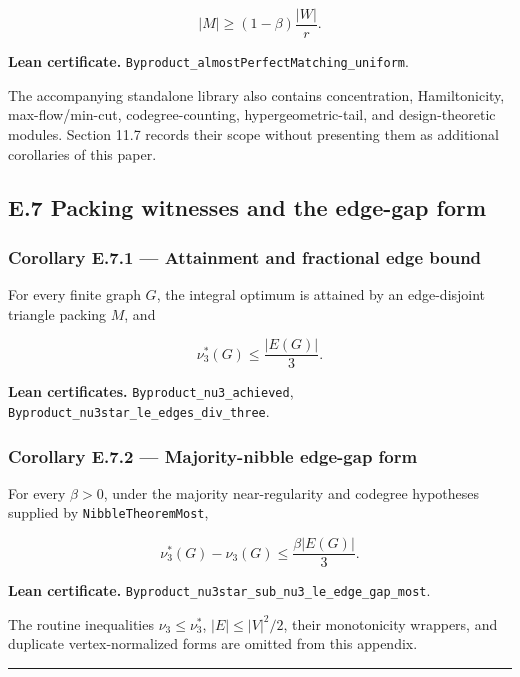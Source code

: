\documentclass[
  american,
  11pt,
  a4paper,
]{article}
\begin{document}
\[
|M|\ge(1-\beta)\frac{|W|}{r}.
\]

\textbf{Lean certificate.} \texttt{Byproduct\_almostPerfectMatching\_uniform}.

The accompanying standalone library also contains concentration, Hamiltonicity, max-flow/min-cut, codegree-counting, hypergeometric-tail, and design-theoretic modules. Section 11.7 records their scope without presenting them as additional corollaries of this paper.

\subsection{E.7 Packing witnesses and the edge-gap form}\label{e.7-packing-witnesses-and-the-edge-gap-form}

\subsubsection{Corollary E.7.1 --- Attainment and fractional edge bound}\label{corollary-e.7.1-attainment-and-fractional-edge-bound}

For every finite graph \(G\), the integral optimum is attained by an edge-disjoint triangle packing \(M\), and

\[
\nu_3^*(G)\le\frac{|E(G)|}{3}.
\]

\textbf{Lean certificates.} \texttt{Byproduct\_nu3\_achieved}, \texttt{Byproduct\_nu3star\_le\_edges\_div\_three}.

\subsubsection{Corollary E.7.2 --- Majority-nibble edge-gap form}\label{corollary-e.7.2-majority-nibble-edge-gap-form}

For every \(\beta>0\), under the majority near-regularity and codegree hypotheses supplied by \texttt{NibbleTheoremMost},

\[
\nu_3^*(G)-\nu_3(G)
\le
\frac{\beta|E(G)|}{3}.
\]

\textbf{Lean certificate.} \texttt{Byproduct\_nu3star\_sub\_nu3\_le\_edge\_gap\_most}.

The routine inequalities \(\nu_3\le\nu_3^*\), \(|E|\le|V|^2/2\), their monotonicity wrappers, and duplicate vertex-normalized forms are omitted from this appendix.

\begin{center}\rule{0.5\linewidth}{0.5pt}\end{center}
\end{document}
